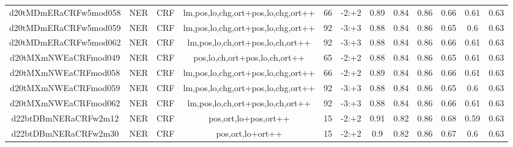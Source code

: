 \documentclass[a4paper]{article}
\begin{document}
\begin{landscape}
\begin{center}
\begin{tabular}{ |c|c|c|c|c|c|c|c|c|c|c|c|}
 
 	
 	\small{ d20tMDmERaCRFw5mod058 } & \small{ NER} & \small{  CRF }  & lm,pos,lo,chg,ort+pos,lo,chg,ort++  &  66 &  \small{  -2:+2 }  &  0.89 & 0.84 & 0.86  &  0.66 & 0.61 & 0.63 \\
 	

 
 	
 	\small{ d20tMDmERaCRFw5mod059 } & \small{ NER} & \small{  CRF }  & lm,pos,lo,chg,ort+pos,lo,chg,ort++  &  92 &  \small{  -3:+3 }  &  0.88 & 0.84 & 0.86  &  0.65 & 0.6 & 0.63 \\
 	

 
 	
 	\small{ d20tMDmERaCRFw5mod062 } & \small{ NER} & \small{  CRF }  & lm,pos,lo,ch,ort+pos,lo,ch,ort++  &  92 &  \small{  -3:+3 }  &  0.88 & 0.84 & 0.86  &  0.66 & 0.61 & 0.63 \\
 	

 
 	
 	\small{ d20tMXmNWEaCRFmod049 } & \small{ NER} & \small{  CRF }  & pos,lo,ch,ort+pos,lo,ch,ort++  &  65 &  \small{  -2:+2 }  &  0.88 & 0.84 & 0.86  &  0.65 & 0.61 & 0.63 \\
 	

 
 	
 	\small{ d20tMXmNWEaCRFmod058 } & \small{ NER} & \small{  CRF }  & lm,pos,lo,chg,ort+pos,lo,chg,ort++  &  66 &  \small{  -2:+2 }  &  0.89 & 0.84 & 0.86  &  0.66 & 0.61 & 0.63 \\
 	

 
 	
 	\small{ d20tMXmNWEaCRFmod059 } & \small{ NER} & \small{  CRF }  & lm,pos,lo,chg,ort+pos,lo,chg,ort++  &  92 &  \small{  -3:+3 }  &  0.88 & 0.84 & 0.86  &  0.65 & 0.6 & 0.63 \\
 	

 
 	
 	\small{ d20tMXmNWEaCRFmod062 } & \small{ NER} & \small{  CRF }  & lm,pos,lo,ch,ort+pos,lo,ch,ort++  &  92 &  \small{  -3:+3 }  &  0.88 & 0.84 & 0.86  &  0.66 & 0.61 & 0.63 \\
 	

 
 	
 	\small{ d22btDBmNERaCRFw2m12 } & \small{ NER} & \small{  CRF }  & pos,ort,lo+pos,ort++  &  15 &  \small{  -2:+2 }  &  0.91 & 0.82 & 0.86  &  0.68 & 0.59 & 0.63 \\
 	

 
 	
 	\small{ d22btDBmNERaCRFw2m30 } & \small{ NER} & \small{  CRF }  & pos,ort,lo+ort++  &  15 &  \small{  -2:+2 }  &  0.9 & 0.82 & 0.86  &  0.67 & 0.6 & 0.63 \\
 	


\end{tabular}
\end{center}
\end{landscape}
\end{document}
